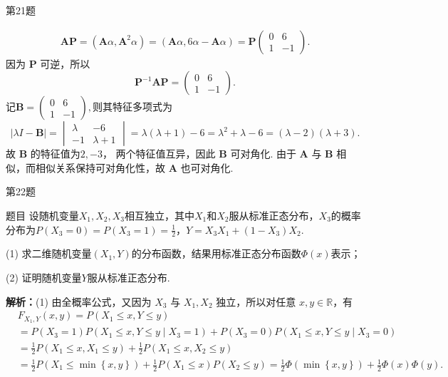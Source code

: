 \documentclass[aspectratio=169]{beamer}
\begin{document}
\begin{frame}{第21题}

\begin{align*}
\bm A\bm P
=(\bm A\alpha,\bm A^2\alpha)
=(\bm A\alpha,6\alpha-\bm A\alpha)
=\bm P\begin{pmatrix}0&6\\1&-1\end{pmatrix}.
\end{align*}
因为 $\bm P$ 可逆，所以
\[
\bm P^{-1}\bm A\bm P
=\begin{pmatrix}0&6\\1&-1\end{pmatrix}.
\]
记$\bm B=\begin{pmatrix}0&6\\1&-1\end{pmatrix},$则其特征多项式为
\[
|\lambda I-\bm B|
=\begin{vmatrix}\lambda&-6\\-1&\lambda+1\end{vmatrix}
=\lambda(\lambda+1)-6
=\lambda^2+\lambda-6
=(\lambda-2)(\lambda+3).
\]
故 $\bm B$ 的特征值为$2,-3$，
两个特征值互异，因此 $\bm B$ 可对角化.
由于 $\bm A$ 与 $\bm B$ 相似，而相似关系保持可对角化性，故 $\bm A$ 也可对角化.
\end{frame}

\begin{frame}{第22题}
\begin{block}{题目}
设随机变量$X_1,X_2,X_3$相互独立，其中$X_1$和$X_2$服从标准正态分布，$X_3$的概率分布为$P(X_3=0)=P(X_3=1)=\frac12$，$Y=X_3X_1+(1-X_3)X_2$.

(1) 求二维随机变量$(X_1,Y)$的分布函数，结果用标准正态分布函数$\Phi(x)$表示；

(2) 证明随机变量$Y$服从标准正态分布.
\end{block}
\textbf{解析：}(1) 由全概率公式，又因为 $X_3$ 与 $X_1,X_2$ 独立，所以对任意 $x,y\in\mathbb R$，有
\begin{align*}
&F_{X_1,Y}\left( x,y \right) =P\left( X_1\leqslant x, Y\leqslant y \right) 
\\
&=P\left( X_3=1 \right) P\left( X_1\leqslant x, Y\leqslant y\mid X_3=1 \right) +P\left( X_3=0 \right) P\left( X_1\leqslant x, Y\leqslant y\mid X_3=0 \right) 
\\
&=\frac{1}{2}P\left( X_1\leqslant x, X_1\leqslant y \right) +\frac{1}{2}P\left( X_1\leqslant x, X_2\leqslant y \right) 
\\
&=\frac{1}{2}P\left( X_1\leqslant \min \left\{ x,y \right\} \right) +\frac{1}{2}P\left( X_1\leqslant x \right) P\left( X_2\leqslant y \right) 
=\frac{1}{2}\Phi \left( \min \left\{ x,y \right\} \right) +\frac{1}{2}\Phi \left( x \right) \Phi \left( y \right) .
\end{align*}
\end{frame}
\end{document}
